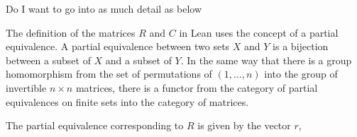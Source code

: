 \documentclass[11pt]{article} %
\begin{document}
\color{red} Do I want to go into as much detail as below\color{black}

The definition of the matrices $R$ and $C$ in Lean uses the concept of a partial equivalence. A partial equivalence between two sets $X$ and $Y$ is a bijection between a subset of $X$ and a subset of $Y$. In the same way that there is a group homomorphism from the set of permutations of $(1, \dots, n)$ into the group of invertible $n \times n$ matrices, there is a functor from the category of partial equivalences on finite sets into the category of matrices.

The partial equivalence corresponding to $R$ is given by the vector $r$,






\end{document}
